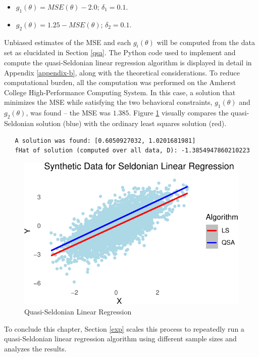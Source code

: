 \documentclass[12pt, twoside]{amherstthesis}
\begin{document}
\begin{itemize}
\item
  \(g_1(\theta) = MSE(\theta) - 2.0 \text{; } \delta_1 = 0.1\).
\item
  \(g_2(\theta) = 1.25 - MSE(\theta) \text{; } \delta_2 = 0.1\).
\end{itemize}
Unbiased estimates of the MSE and each \(g_i(\theta)\) will be computed from the data set as elucidated in Section \ref{qsa}. The Python code used to implement and compute the quasi-Seldonian linear regression algorithm is displayed in detail in Appendix \ref{appendix-b}, along with the theoretical considerations. To reduce computational burden, all the computation was performed on the Amherst College High-Performance Computing System. In this case, a solution that minimizes the MSE while satisfying the two behavioral constraints, \(g_1(\theta)\) and \(g_2(\theta)\), was found -- the MSE was \(1.385\). Figure \ref{fig:fig3} visually compares the quasi-Seldonian solution (blue) with the ordinary least squares solution (red).
\begin{verbatim}
   A solution was found: [0.6050927032, 1.0201681981]
   fHat of solution (computed over all data, D): -1.3854947860210223
\end{verbatim}
\begin{figure}

{\centering \includegraphics{Dasha-Asienga_StatThesis_files/figure-latex/fig3-1} 

}

\caption{Quasi-Seldonian Linear Regression}\label{fig:fig3}
\end{figure}
To conclude this chapter, Section \ref{exp} scales this process to repeatedly run a quasi-Seldonian linear regression algorithm using different sample sizes and analyzes the results.
\end{document}
